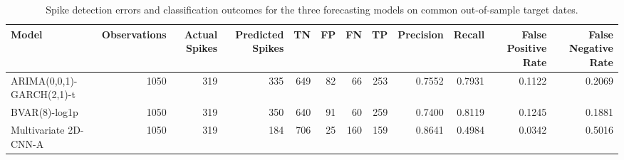 \begin{table}
\caption{Spike detection errors and classification outcomes for the three forecasting models on common out-of-sample target dates.}
\label{tab:spike_error_analysis}
\begin{tabular}{lrrrrrrrrrrr}
\toprule
Model & Observations & Actual Spikes & Predicted Spikes & TN & FP & FN & TP & Precision & Recall & False Positive Rate & False Negative Rate \\
\midrule
ARIMA(0,0,1)-GARCH(2,1)-t & 1050 & 319 & 335 & 649 & 82 & 66 & 253 & 0.7552 & 0.7931 & 0.1122 & 0.2069 \\
BVAR(8)-log1p & 1050 & 319 & 350 & 640 & 91 & 60 & 259 & 0.7400 & 0.8119 & 0.1245 & 0.1881 \\
Multivariate 2D-CNN-A & 1050 & 319 & 184 & 706 & 25 & 160 & 159 & 0.8641 & 0.4984 & 0.0342 & 0.5016 \\
\bottomrule
\end{tabular}
\end{table}
